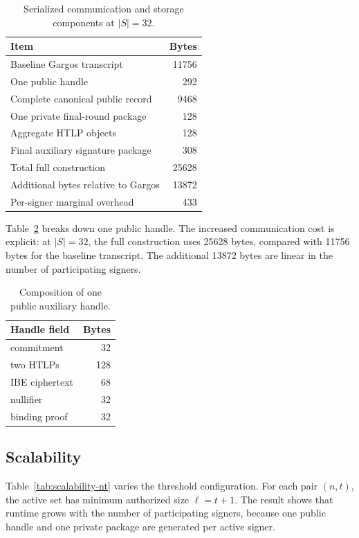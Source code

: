 \begin{table}[t]
\centering
\caption{Serialized communication and storage components at $|S|=32$.}
\label{tab:communication-total}
\small
\begin{tabular}{lr}
\toprule
Item & Bytes \\
\midrule
Baseline Gargos transcript & 11756 \\
One public handle & 292 \\
Complete canonical public record & 9468 \\
One private final-round package & 128 \\
Aggregate HTLP objects & 128 \\
Final auxiliary signature package & 308 \\
Total full construction & 25628 \\
Additional bytes relative to Gargos & 13872 \\
Per-signer marginal overhead & 433 \\
\bottomrule
\end{tabular}
\end{table}

Table~\ref{tab:handle-composition} breaks down one public handle.  The increased
communication cost is explicit: at $|S|=32$, the full construction uses 25628
bytes, compared with 11756 bytes for the baseline transcript.  The additional
13872 bytes are linear in the number of participating signers.

\begin{table}[t]
\centering
\caption{Composition of one public auxiliary handle.}
\label{tab:handle-composition}
\small
\begin{tabular}{lr}
\toprule
Handle field & Bytes \\
\midrule
commitment & 32 \\
two HTLPs & 128 \\
IBE ciphertext & 68 \\
nullifier & 32 \\
binding proof & 32 \\
\bottomrule
\end{tabular}
\end{table}

\subsection{Scalability}

Table~\ref{tab:scalability-nt} varies the threshold configuration.  For each
pair $(n,t)$, the active set has minimum authorized size $\ell=t+1$.  The result
shows that runtime grows with the number of participating signers, because one
public handle and one private package are generated per active signer.

